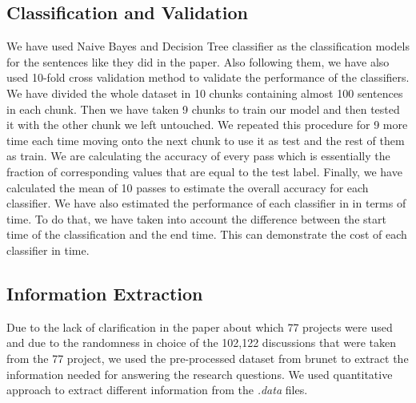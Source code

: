 \subsection{Classification and Validation}
We have used Naive Bayes and Decision Tree classifier as the classification models for the sentences like they did in the paper. Also following them, we have also used 10-fold cross validation method to validate the performance of the classifiers. We have divided the whole dataset in 10 chunks containing almost 100 sentences in each chunk. Then we have taken 9 chunks to train our model and then tested it with the other chunk we left untouched. We repeated this procedure for 9 more time each time moving onto the next chunk to use it as test and the rest of them as train. We are calculating the accuracy of every pass which is essentially the fraction of corresponding values that are equal to the test label. Finally, we have calculated the mean of 10 passes to estimate the overall accuracy for each classifier. We have also estimated the performance of each classifier in in terms of time. To do that, we have taken into account the difference between the start time of the classification and the end time. This can demonstrate the cost of each classifier in time.

\subsection{Information Extraction}
Due to the lack of clarification in the paper about which 77 projects were used and due to the randomness in choice of the 102,122 discussions that were taken from the 77 project, we used the pre-processed dataset from brunet to extract the information needed for answering the research questions. We used quantitative approach to extract different information from the \emph{.data} files.  